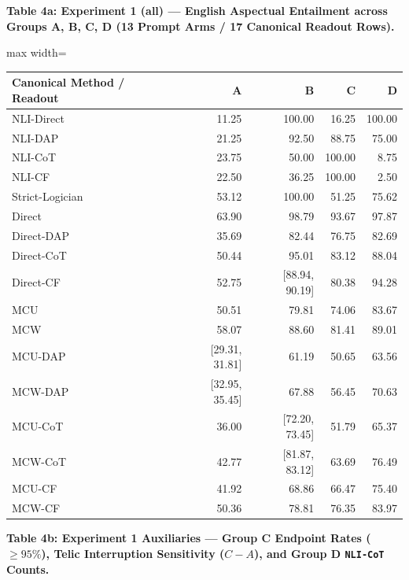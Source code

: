 \documentclass[11pt,a4paper]{article}
\begin{document}
\textbf{Table 4a: Experiment 1 (all) --- English Aspectual Entailment across Groups A, B, C, D (13 Prompt Arms / 17 Canonical Readout Rows).}

\begin{center}\begingroup\small\setlength{\tabcolsep}{4.5pt}\renewcommand{\arraystretch}{1.12}\begin{adjustbox}{max width=\textwidth}\begin{tabular}{lrrrr}\toprule
\textbf{Canonical Method / Readout} & \textbf{A} & \textbf{B} & \textbf{C} & \textbf{D} \\ \midrule
NLI-Direct & 11.25 & 100.00 & 16.25 & 100.00 \\
NLI-DAP & 21.25 & 92.50 & 88.75 & 75.00 \\
NLI-CoT & 23.75 & 50.00 & 100.00 & 8.75 \\
NLI-CF & 22.50 & 36.25 & 100.00 & 2.50 \\
Strict-Logician & 53.12 & 100.00 & 51.25 & 75.62 \\
Direct & 63.90 & 98.79 & 93.67 & 97.87 \\
Direct-DAP & 35.69 & 82.44 & 76.75 & 82.69 \\
Direct-CoT & 50.44 & 95.01 & 83.12 & 88.04 \\
Direct-CF & 52.75 & [88.94, 90.19] & 80.38 & 94.28 \\
MCU & 50.51 & 79.81 & 74.06 & 83.67 \\
MCW & 58.07 & 88.60 & 81.41 & 89.01 \\
MCU-DAP & [29.31, 31.81] & 61.19 & 50.65 & 63.56 \\
MCW-DAP & [32.95, 35.45] & 67.88 & 56.45 & 70.63 \\
MCU-CoT & 36.00 & [72.20, 73.45] & 51.79 & 65.37 \\
MCW-CoT & 42.77 & [81.87, 83.12] & 63.69 & 76.49 \\
MCU-CF & 41.92 & 68.86 & 66.47 & 75.40 \\
MCW-CF & 50.36 & 78.81 & 76.35 & 83.97 \\
\bottomrule\end{tabular}\end{adjustbox}\endgroup\end{center}

\textbf{Table 4b: Experiment 1 Auxiliaries --- Group C Endpoint Rates ($\ge 95\%$), Telic Interruption Sensitivity ($C-A$), and Group D \texttt{NLI-\allowbreak{}CoT} Counts.}
\end{document}
